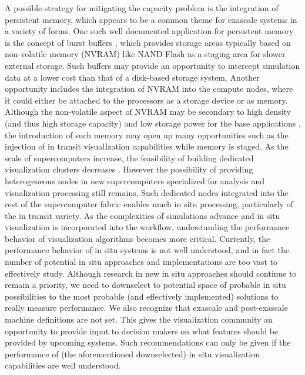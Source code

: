 \begin{refsection}
A possible strategy for mitigating the capacity problem is the integration of persistent memory, which appears to be a common theme for exascale systems in a variety of forms. One such well documented application for persistent memory is the concept of burst buffers \cite{Bent12}, which provides storage areas typically based on non-volatile memory (NVRAM) like NAND Flash as a staging area for slower external storage. Such buffers may provide an opportunity to intercept simulation data at a lower cost than that of a disk-based storage system. Another opportunity includes the integration of NVRAM into the compute nodes, where it could either be attached to the processors as a storage device or as memory. Although the non-volatile aspect of NVRAM may be secondary to high density (and thus high storage capacity) and low storage power for the base applications \cite{Caulfield10}, the introduction of such memory may open up many opportunities such as the injection of in transit visualIzation capabilities while memory is staged.
As the scale of supercomputers increase, the feasibility of building dedicated visualization clusters decreases \cite{Childs07}. However the possibility of providing heterogeneous nodes in new supercomputers specialized for analysis and visualization processing still remains. Such dedicated nodes integrated into the rest of the supercomputer fabric enables much in situ processing, particularly of the in transit variety.
As the complexities of simulations advance and in situ visualization is incorporated into the workflow, understanding the performance behavior of visualization algorithms becomes more critical. Currently, the performance behavior of in situ systems is not well understood, and in fact the number of potential in situ approaches and implementations are too vast to effectively study. Although research in new in situ approaches should continue to remain a priority, we need to downselect to potential space of probable in situ possibilities to the most probable (and effectively implemented) solutions to really measure performance.
We also recognize that exascale and post-exascale machine definitions are not set. This gives the visualization community an opportunity to provide input to decision makers on what features should be provided by upcoming systems. Such recommendations can only be given if the performance of (the aforementioned downselected) in situ visualization capabilities are well understood.


\end{refsection}
